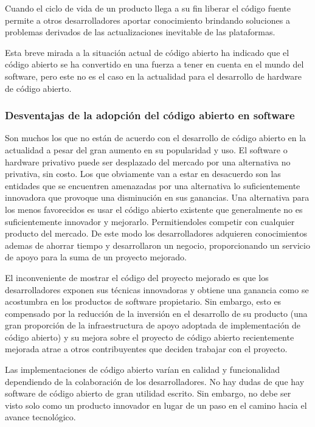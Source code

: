 Cuando el ciclo de vida de un producto llega a su fin liberar el código fuente permite a otros desarrolladores aportar conocimiento brindando soluciones a problemas derivados de las actualizaciones inevitable de las plataformas. 

Esta breve mirada a la situación actual de código abierto ha indicado que el código abierto se ha convertido en una fuerza a tener en cuenta en el mundo del software, pero este no es el caso en la actualidad para el desarrollo de hardware de código abierto.


\subsubsection{Desventajas de la adopción del código abierto en software}

Son muchos los que no están de acuerdo con el desarrollo de código abierto en la actualidad a pesar del gran aumento en su popularidad y uso. El software o hardware privativo puede ser desplazado del mercado por una alternativa no privativa, sin costo. Los que obviamente van a estar en desacuerdo son las entidades que se encuentren amenazadas por una alternativa lo suficientemente innovadora que provoque una disminución en sus ganancias. Una alternativa para los menos favorecidos es usar el código abierto existente que generalmente no es suficientemente innovador y mejorarlo. Permitiendoles competir con cualquier producto del mercado. De este modo los desarrolladores adquieren conocimientos ademas de ahorrar tiempo y desarrollaron un negocio, proporcionando un servicio de apoyo para la suma de un proyecto mejorado.


El inconveniente de mostrar el código del proyecto mejorado es que los desarrolladores exponen sus técnicas innovadoras y obtiene una ganancia como se acostumbra en los productos de software propietario. Sin embargo, esto es compensado por la reducción de la inversión en el desarrollo de su producto (una gran proporción de
la infraestructura de apoyo adoptada de implementación de código abierto) y su mejora sobre el proyecto de código abierto recientemente mejorada atrae a otros contribuyentes que deciden trabajar con el proyecto.

Las implementaciones de código abierto varían en calidad y funcionalidad dependiendo de la colaboración de los desarrolladores. No hay dudas de que hay software de código abierto de gran utilidad escrito. Sin embargo, no debe ser visto solo como un producto innovador en lugar de un paso en el camino hacia el avance tecnológico.

